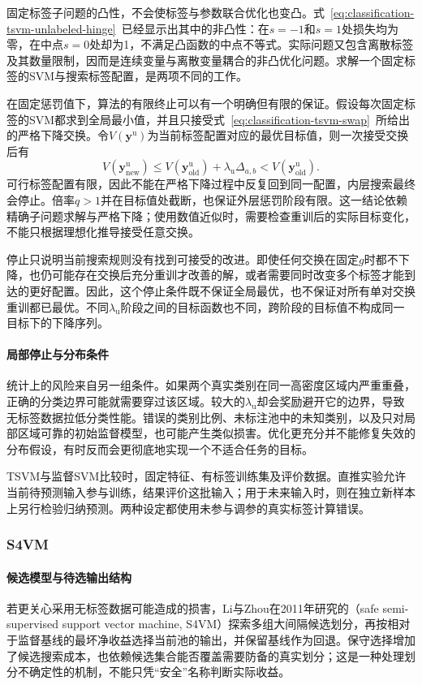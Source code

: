 固定标签子问题的凸性，不会使标签与参数联合优化也变凸。式~\eqref{eq:classification-tsvm-unlabeled-hinge}~已经显示出其中的非凸性：在$s=-1$和$s=1$处损失均为零，在中点$s=0$处却为1，不满足凸函数的中点不等式。实际问题又包含离散标签及其数量限制，因而是连续变量与离散变量耦合的非凸优化问题。求解一个固定标签的SVM与搜索标签配置，是两项不同的工作。

在固定惩罚值下，算法的有限终止可以有一个明确但有限的保证。假设每次固定标签的SVM都求到全局最小值，并且只接受式~\eqref{eq:classification-tsvm-swap}~所给出的严格下降交换。令$V(\bm{y}^{\mathrm{u}})$为当前标签配置对应的最优目标值，则一次接受交换后有
\[
  V(\bm{y}_{\mathrm{new}}^{\mathrm{u}})
    \leq V(\bm{y}_{\mathrm{old}}^{\mathrm{u}})
      +\lambda_{\mathrm{u}}\Delta_{a,b}
    <V(\bm{y}_{\mathrm{old}}^{\mathrm{u}}).
\]
可行标签配置有限，因此不能在严格下降过程中反复回到同一配置，内层搜索最终会停止。倍率$q>1$并在目标值处截断，也保证外层惩罚阶段有限。这一结论依赖精确子问题求解与严格下降；使用数值近似时，需要检查重训后的实际目标变化，不能只根据理想化推导接受任意交换。

停止只说明当前搜索规则没有找到可接受的改进。即使任何交换在固定$g$时都不下降，也仍可能存在交换后充分重训才改善的解，或者需要同时改变多个标签才能到达的更好配置。因此，这个停止条件既不保证全局最优，也不保证对所有单对交换重训都已最优。不同$\lambda_{\mathrm{u}}$阶段之间的目标函数也不同，跨阶段的目标值不构成同一目标下的下降序列。

\paragraph{局部停止与分布条件}
统计上的风险来自另一组条件。如果两个真实类别在同一高密度区域内严重重叠，正确的分类边界可能就需要穿过该区域。较大的$\lambda_{\mathrm{u}}$却会奖励避开它的边界，导致无标签数据拉低分类性能。错误的类别比例、未标注池中的未知类别，以及只对局部区域可靠的初始监督模型，也可能产生类似损害。优化更充分并不能修复失效的分布假设，有时反而会更彻底地实现一个不适合任务的目标。

TSVM与监督SVM比较时，固定特征、有标签训练集及评价数据。直推实验允许当前待预测输入参与训练，结果评价这批输入；用于未来输入时，则在独立新样本上另行检验归纳预测。两种设定都使用未参与调参的真实标签计算错误。

\subsubsection{S4VM}
\label{sec:classification-s4vm}

\paragraph{候选模型与待选输出结构}
若更关心采用无标签数据可能造成的损害，Li与Zhou在2011年研究的（safe semi-supervised support vector machine, S4VM）探索多组大间隔候选划分，再按相对于监督基线的最坏净收益选择当前池的输出，并保留基线作为回退。保守选择增加了候选搜索成本，也依赖候选集合能否覆盖需要防备的真实划分；这是一种处理划分不确定性的机制，不能只凭“安全”名称判断实际收益。

